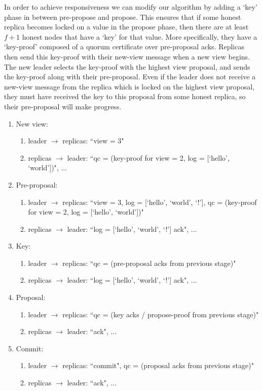 In order to achieve responsiveness we can modify our algorithm by adding a `key' phase in between pre-propose and propose. This ensures that if some honest replica becomes locked on a value in the propose phase, then there are at least $f + 1$ honest nodes that have a `key' for that value. More specifically, they have a `key-proof' composed of a quorum certificate over pre-proposal acks. Replicas then send this key-proof with their new-view message when a new view begins. The new leader selects the key-proof with the highest view proposal, and sends the key-proof along with their pre-proposal. Even if the leader does not receive a new-view message from the replica which is locked on the highest view proposal, they must have received the key to this proposal from some honest replica, so their pre-proposal will make progress.

\begin{enumerate}
\item New view: 
	\begin{enumerate}
	\item leader $\to$ replicas: ``view = 3" 
	\item replicas $\to$ leader: ``qc = (key-proof for view = 2, log = [`hello', `world'])", ...
	\end{enumerate}
\item Pre-proposal:
	\begin{enumerate}
	\item leader $\to$ replicas: ``view = 3, log = [`hello', `world', `!'], qc = (key-proof for view = 2, log = [`hello', `world'])"
	\item replicas $\to$ leader: ``log = [`hello', `world', `!'] ack", ...
	\end{enumerate}
\item Key:
	\begin{enumerate}
	\item leader $\to$ replicas: ``qc = (pre-proposal acks from previous stage)"
	\item replicas $\to$ leader: ``log = [`hello', `world', `!'] ack", ...
	\end{enumerate}

\item Proposal:
	\begin{enumerate}
	\item leader $\to$ replicas: ``qc = (key acks / propose-proof from previous stage)"
	\item replicas $\to$ leader: ``ack", ...
	\end{enumerate}
\item Commit:
	\begin{enumerate}
	\item leader $\to$ replicas: ``commit", qc = (proposal acks from previous stage)"
	\item replicas $\to$ leader: ``ack", ...
	\end{enumerate}
\end{enumerate}

